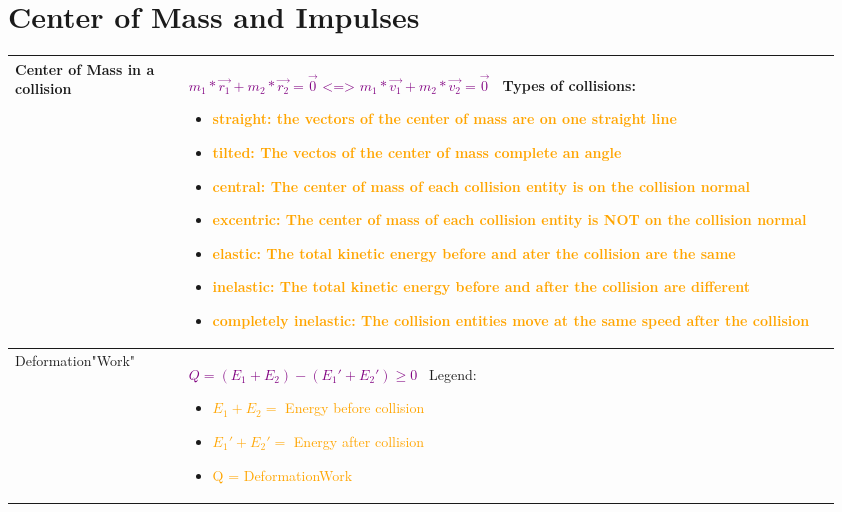 \documentclass[main.tex,fontsize=8pt,paper=a4,paper=portrait,DIV=calc,]{scrartcl}
\begin{document}
\begin{table}[ht!]
\section{Center of Mass and Impulses} 
\begin{tabular}{|m{0.2\linewidth}|m{0.755\linewidth}|}
\hline
Center of Mass in a collision &
\vspace{2mm}
\Huge \textcolor{purple}{\( m_1 * \vec{r_1} + m_2 * \vec{r_2} = \vec{0} \text{ <=> } m_1*\vec{v_1} + m_2 * \vec{v_2} = \vec{0} \)}\newline
\normalsize \, \newline
Types of collisions:\newline
\begin{itemize}
\item \textcolor{orange}{straight: the vectors of the center of mass are on one straight line}
\item \textcolor{orange}{tilted: The vectos of the center of mass complete an angle}
\item \textcolor{orange}{central: The center of mass of each collision entity is on the collision normal}
\item \textcolor{orange}{excentric: The center of mass of each collision entity is NOT on the collision normal }
\item \textcolor{orange}{elastic: The total kinetic energy before and ater the collision are the same}
\item \textcolor{orange}{inelastic: The total kinetic energy before and after the collision are different}
\item \textcolor{orange}{completely inelastic: The collision entities move at the same speed after the collision}
\vspace{-3mm}
\end{itemize} 
\\
\hline
Deformation"Work" & 
\vspace{2mm}
\Huge \textcolor{purple}{\( Q = (E_1 + E_2) - (E_1' + E_2') \geq 0 \)}\newline
\normalsize \, \newline
Legend:\newline
\begin{itemize}
\item \textcolor{orange}{\( E_1 + E_2 =\) Energy before collision}
\item \textcolor{orange}{\( E_1' + E_2' =\) Energy after collision}
\item \textcolor{orange}{Q = DeformationWork}
\vspace{-3mm}

\end{itemize}
\end{tabular}
\end{table}
\end{document}
